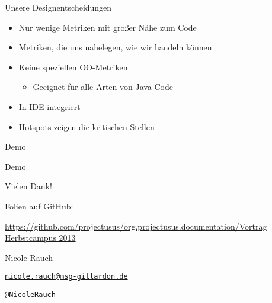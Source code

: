 \begin{frame}[fragile]{Unsere Designentscheidungen}
\begin{itemize}
\item Nur wenige Metriken mit großer Nähe zum Code
\item Metriken, die uns nahelegen, wie wir handeln können
\item Keine speziellen OO-Metriken
\begin{itemize}
\item Geeignet für alle Arten von Java-Code
\end{itemize}
\item In IDE integriert
\item Hotspots zeigen die kritischen Stellen
\end{itemize}

\end{frame}


\begin{frame}[fragile]{Demo}
\begin{center}
{\Huge Demo}
\end{center}
\end{frame}

{
\begin{frame}{Vielen Dank!}

        Folien auf GitHub:
        \begin{center}
                \url{https://github.com/projectusus/org.projectusus.documentation/Vortrag Herbstcampus 2013}
        \end{center}

        \begin{block}{Nicole Rauch}
        \begin{description}[Twitterxx]
                \item[E-Mail]  \href{mailto:nicole.rauch@msg-gillardon.de}{\texttt{nicole.rauch@msg-gillardon.de}}
                \item[Twitter] \href{http://twitter.com/NicoleRauch}{\texttt{@NicoleRauch}}
        \end{description}
        \end{block}
\end{frame}
}
